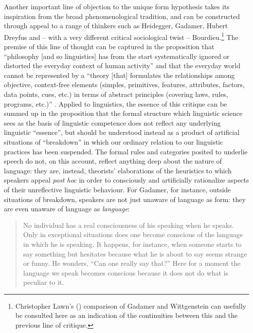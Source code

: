 \documentclass[output=paper]{langscibook}
\begin{document}
Another important line of objection to the unique form hypothesis takes its inspiration from the broad phenomenological tradition, and can be constructed through appeal to a range of thinkers such as Heidegger, Gadamer, Hubert Dreyfus and -- with a very different critical sociological twist -- Bourdieu.\footnote{Christopher Lawn’s (\citeyear{Lawn2004}) comparison of Gadamer and Wittgenstein can usefully be consulted here as an indication of the continuities between this and the previous line of critique.} The premise of this line of thought can be captured in the proposition that ``philosophy [and so linguistics] has from the start systematically ignored or distorted the everyday context of human activity'' and that the everyday world cannot be represented by a ``theory [that] formulates the relationships among objective, context-free elements (simples, primitives, features, attributes, factors, data points, cues, etc.) in terms of abstract principles (covering laws, rules, programs, etc.)'' \citep[25, 28]{DreyfusDreyfus1988}. Applied to linguistics, the essence of this critique can be summed up in the proposition that the formal structure which linguistic science sees as the basis of linguistic competence does not reflect any underlying linguistic ``essence'', but should be understood instead as a product of artificial situations of ``breakdown'' in which our ordinary relation to our linguistic practices has been suspended. The formal rules and categories posited to underlie speech do not, on this account, reflect anything deep about the nature of language: they are, instead, theorists' elaborations of the heuristics to which speakers appeal \emph{post hoc} in order to consciously and artificially rationalize aspects of their unreflective linguistic behaviour. For Gadamer, for instance, outside situations of breakdown, speakers are not just unaware of language as form: they are even unaware of language as \emph{language}:

\begin{quotation}
No individual has a real consciousness of his speaking when he speaks. Only in exceptional situations does one become conscious of the language in which he is speaking. It happens, for instance, when someone starts to say something but hesitates because what he is about to say seems strange or funny. He wonders, ``Can one really say that?'' Here for a moment the language we speak becomes conscious because it does not do what is peculiar to it. \citep[64]{Gadamer19761966}
\end{quotation}
\end{document}
